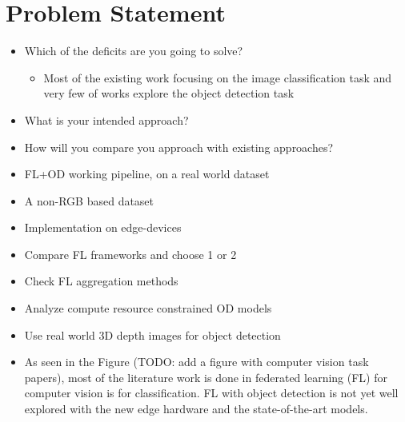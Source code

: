 \documentclass[thesis]{mas_proposal}
\begin{document}
\section{Problem Statement}
\begin{itemize}


      \item Which of the deficits are you going to solve?
      \begin{itemize}
            \item Most of the existing work focusing on the image classification task and very few of works explore the object detection task
      \end{itemize}
      \item What is your intended approach?
      \item How will you compare you approach with existing approaches?
      \item FL+OD working pipeline, on a real world dataset
      \item A non-RGB based dataset
      \item Implementation on edge-devices
      \item Compare FL frameworks and choose 1 or 2
      \item Check FL aggregation methods
      \item Analyze compute resource constrained OD models
      \item Use real world 3D depth images for object detection
      
      \item As seen in the Figure (TODO: add a figure with computer vision task papers), most of the literature work is done in federated learning (FL) for computer vision is for classification. FL with object detection is not yet well explored with the new edge hardware and the state-of-the-art models.


\end{itemize}
\end{document}
